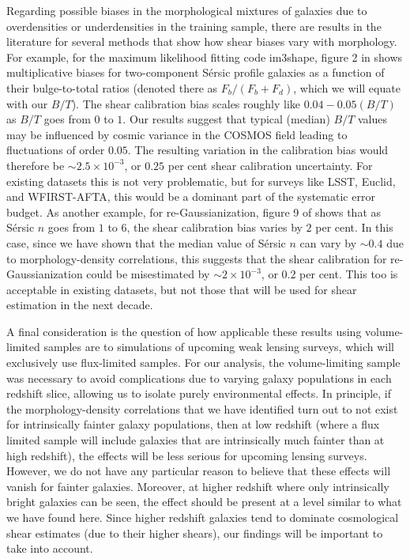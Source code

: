 \documentclass[twocolumn,useAMS,usenatbib]{mn2e}
\newcommand{\sersic}{S\'{e}rsic }
\begin{document}
Regarding possible biases in the morphological mixtures of galaxies
due to overdensities or underdensities in the training sample, there
are results in the literature for several methods that show how shear
biases vary with morphology.  For example, for the maximum likelihood
fitting code {\sc im3shape}, figure 2 in \cite{2012MNRAS.427.2711K}
shows multiplicative biases for two-component \sersic profile galaxies
as a function of their bulge-to-total ratios (denoted there as
$F_b/(F_b+F_d)$, which we will equate with our $B/T$).  The shear
calibration bias scales roughly like $0.04 - 0.05(B/T)$ as $B/T$ goes
from $0$ to $1$.  Our results suggest that typical (median) $B/T$
values may be influenced by cosmic variance in the COSMOS field
leading to fluctuations of order $0.05$.  The resulting variation in
the calibration bias would therefore be $\sim 2.5\times 10^{-3}$, or
$0.25$ per cent shear calibration uncertainty.  For existing datasets
this is not very problematic, but for surveys like LSST, Euclid, and
WFIRST-AFTA, this would be a dominant part of the systematic error
budget.  As another example, for re-Gaussianization, figure 9 of
\cite{2012MNRAS.420.1518M} shows that as \sersic $n$ goes from $1$ to
$6$, the shear calibration bias varies by $2$ per cent.  In this case,
since we have shown that the median value of \sersic $n$ can vary by
$\sim 0.4$ due to morphology-density correlations, this suggests that
the shear calibration for re-Gaussianization could be misestimated by
$\sim 2\times 10^{-3}$, or 0.2 per cent.  This too is acceptable in
existing datasets, but not those that will be used for shear
estimation in the next decade.

A final consideration is the question of how applicable these results
using volume-limited samples are to simulations of upcoming weak
lensing surveys, which will exclusively use flux-limited samples.  For
our analysis, the volume-limiting sample was necessary to avoid
complications due to varying galaxy populations in each redshift
slice, allowing us to isolate purely environmental effects.  In
principle, if the morphology-density correlations that we have
identified turn out to not exist for intrinsically fainter galaxy
populations, then at low redshift (where a flux limited sample will
include galaxies that are intrinsically much fainter than at high
redshift), the effects will be less serious for upcoming lensing
surveys.  However, we do not have any particular reason to believe
that these effects will vanish for fainter galaxies.  Moreover, at
higher redshift where only intrinsically bright galaxies can be seen,
the effect should be present at a level similar to what we have found
here.  Since higher redshift galaxies tend to dominate cosmological
shear estimates (due to their higher shears), our findings will be
important to take into account.
\end{document}
